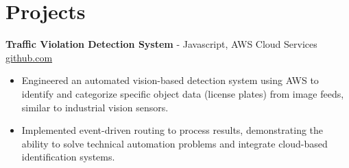 \documentclass[11pt]{article}       %
\begin{document}
\vspace{-18.5pt}

\section*{Projects}

\textbf{Traffic Violation Detection System}{ - Javascript, AWS Cloud Services} \hfill \href{https://github.com/Monica20030707/AWS_rekonigition-N-read-database}{github.com} \\
\vspace{-9pt}
\begin{itemize}
  \item Engineered an automated vision-based detection system using AWS to identify and categorize specific object data (license plates) from image feeds, similar to industrial vision sensors.
  \item Implemented event-driven routing to process results, demonstrating the ability to solve technical automation problems and integrate cloud-based identification systems.
\end{itemize}

\end{document}
